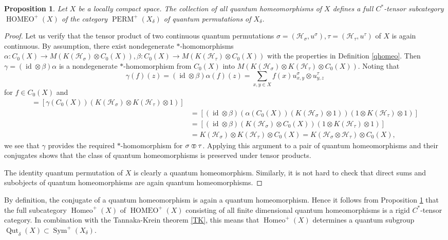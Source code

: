 \documentclass[a4paper]{amsart}
\newcommand*{\Hc}{\mathcal{H}}
\DeclareMathOperator{\id}{id}
\DeclareMathOperator{\PERM}{PERM}
\DeclareMathOperator{\Homeo}{Homeo}
\DeclareMathOperator{\HOMEO}{HOMEO}
\DeclareMathOperator{\Sym}{Sym}
\DeclareMathOperator{\Qut}{Qut}
\newcommand{\tp}{\!\!
{\scriptstyle
\text{
\raisebox{0.7pt}{
\textcircled{\raisebox{-1.3pt}{$\mathsf{T}$}}
} 
} 
} 
\!\!}
\numberwithin{equation}{section}
\theoremstyle{change}
\newtheorem{prop}[theorem]{Proposition}
\begin{document}
\begin{prop} \label{qhomeocategory}
Let $ X $ be a locally compact space. The collection of all quantum homeomorphisms of $ X $ defines a full $ C^* $-tensor subcategory $ \HOMEO^+(X) $ 
of the category $ \PERM^+(X_\delta) $ of quantum permutations of $ X_\delta $. 
\end{prop} 

\begin{proof} 
Let us verify that the tensor product of two continuous quantum permutations $ \sigma = (\Hc_\sigma, u^\sigma), \tau = (\Hc_\tau, u^\tau) $ of $ X $ is again continuous. 
By assumption, there exist nondegenerate $ * $-homomorphisms $ \alpha: C_0(X) \rightarrow M(K(\Hc_\sigma) \otimes C_0(X)), \beta: C_0(X) \rightarrow M(K(\Hc_\tau) \otimes C_0(X)) $ 
with the properties in Definition \ref{qhomeo}. Then $ \gamma = (\id \otimes \beta)\alpha $ is a nondegenerate $ * $-homomorphism from $ C_0(X) $ into $ M(K(\Hc_\sigma) \otimes K(\Hc_\tau) \otimes C_0(X)) $. Noting that 
$$
\gamma(f)(z) = (\id \otimes \beta)\alpha(f)(z)  
=\sum_{x,y \in X} f(x) u^\sigma_{x, y} \otimes u^\tau_{y, z} 
$$
for $ f \in C_0(X) $ and 
\begin{align*}
[\gamma(C_0(X)) &(K(\Hc_\sigma \otimes \Hc_\tau) \otimes 1)] = [\gamma(C_0(X)) (K(\Hc_\sigma) \otimes K(\Hc_\tau) \otimes 1)] \\
&= [(\id \otimes \beta)(\alpha(C_0(X)) (K(\Hc_\sigma) \otimes 1))(1 \otimes K(\Hc_\tau) \otimes 1)] \\
&= [(\id \otimes \beta)(K(\Hc_\sigma) \otimes C_0(X))(1 \otimes K(\Hc_\tau) \otimes 1)] \\
&= K(\Hc_\sigma) \otimes K(\Hc_\tau) \otimes C_0(X) = K(\Hc_\sigma \otimes \Hc_\tau) \otimes C_0(X),
\end{align*}
we see that $ \gamma $ provides the required $ * $-homomorphism for $ \sigma \tp \tau $. 
Applying this argument to a pair of quantum homeomorphisms and their conjugates shows that the class of quantum homeomorphisms is preserved under tensor products. 

The identity quantum permutation of $ X $ is clearly a quantum homeomorphism. 
Similarly, it is not hard to check that direct sums and subobjects of quantum homeomorphisms are again quantum homeomorphisms.
\end{proof} 

By definition, the conjugate of a quantum homeomorphism is again a quantum homeomorphism. 
Hence it follows from Proposition \ref{qhomeocategory} that the full subcategory $ \Homeo^+(X) $ of $ \HOMEO^+(X) $ consisting of all finite dimensional quantum homeomorphisms is a rigid $ C^* $-tensor category. In combination with the Tannaka-Krein theorem \ref{TK}, this means that $ \Homeo^+(X) $ determines a quantum subgroup $ \Qut_\delta(X) \subset \Sym^+(X_\delta) $. 
\end{document}
